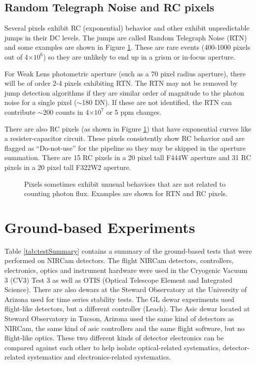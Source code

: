 \documentclass{aastex62}
\begin{document}
\clearpage

\subsection{Random Telegraph Noise and RC pixels}
Several pixels exhibit RC (exponential) behavior and other exhibit unpredictable jumps in their DC levels.
The jumps are called Random Telegraph Noise (RTN) and some examples are shown in Figure \ref{fig:RTNandRC}.
These are rare events (400-1000 pixels out of 4$\times 10^6$) so they are unlikely to end up in a grism or in-focus aperture.

For Weak Lens photometric aperture (such as a 70 pixel radius aperture), there will be of order 2-4 pixels exhibiting RTN.
The RTN may not be removed by jump detection algorithms if they are similar order of magnitude to the photon noise for a single pixel ($\sim$180 DN).
If these are not identified, the RTN can contribute $\sim$200 counts in 4$\times 10^7$ or 5 ppm changes.

There are also RC pixels (as shown in Figure \ref{fig:RTNandRC}) that have exponential curves like a resister-capacitor circuit.
These pixels consistently show RC behavior and are flagged as ``Do-not-use'' for the pipeline so they may be skipped in the aperture summation.
There are 15 RC pixels in a 20 pixel tall F444W aperture and 31 RC pixels in a 20 pixel tall F322W2 aperture.

\begin{figure}
\caption{Pixels sometimes exhibit unusual behaviors that are not related to counting photon flux.
Examples are shown for RTN and RC pixels.
}\label{fig:RTNandRC}
\end{figure}


\clearpage
\section{Ground-based Experiments}\label{sec:experiments}

Table \ref{tab:testSummary} contains a summary of the ground-based tests that were performed on NIRCam detectors.
The flight NIRCam detectors, controllers, electronics, optics and instrument hardware were used in the Cryogenic Vacuum 3 (CV3) Test 3 as well as OTIS (Optical Telescope Element and Integrated Science).
There are also dewars at the Steward Observatory at the University of Arizona used for time series stability tests.
The GL dewar experiments used flight-like detectors, but a different controller (Leach).
The Asic dewar located at Steward Observatory in Tucson, Arizona used the same kind of detectors as NIRCam, the same kind of asic controllers and the same flight software, but no flight-like optics.
These two different kinds of detector electronics can be compared against each other to help isolate optical-related systematics, detector-related systematics and electronics-related systematics.
\end{document}
